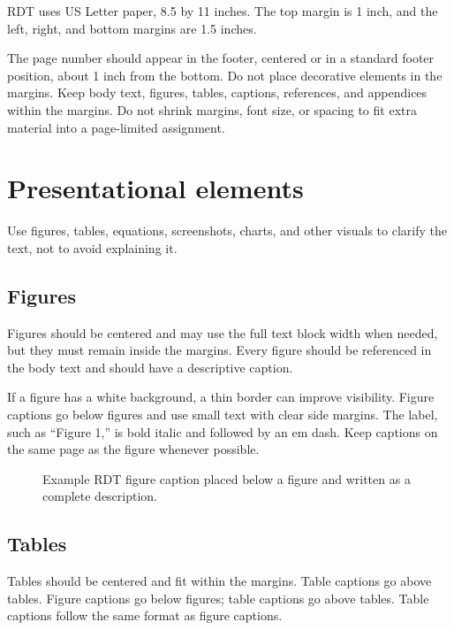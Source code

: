 \documentclass[11pt,letterpaper]{article}
\begin{document}
RDT uses US Letter paper, 8.5 by 11 inches. The top margin is 1 inch,
and the left, right, and bottom margins are 1.5 inches.

The page number should appear in the footer, centered or in a standard
footer position, about 1 inch from the bottom. Do not place decorative
elements in the margins. Keep body text, figures, tables, captions,
references, and appendices within the margins. Do not shrink margins,
font size, or spacing to fit extra material into a page-limited
assignment.

\section{Presentational elements}

Use figures, tables, equations, screenshots, charts, and other visuals
to clarify the text, not to avoid explaining it.

\subsection{Figures}

Figures should be centered and may use the full text block width when
needed, but they must remain inside the margins. Every figure should be
referenced in the body text and should have a descriptive caption.

If a figure has a white background, a thin border can improve
visibility. Figure captions go below figures and use small text with
clear side margins. The label, such as ``Figure 1,'' is bold italic and
followed by an em dash. Keep captions on the same page as the figure
whenever possible.

\begin{figure}[h]
\centering
{}
\caption{Example RDT figure caption placed below a figure and written as
a complete description.}
\end{figure}

\subsection{Tables}

Tables should be centered and fit within the margins. Table captions go
above tables. Figure captions go below figures; table captions go above
tables. Table captions follow the same format as figure captions.
\end{document}
